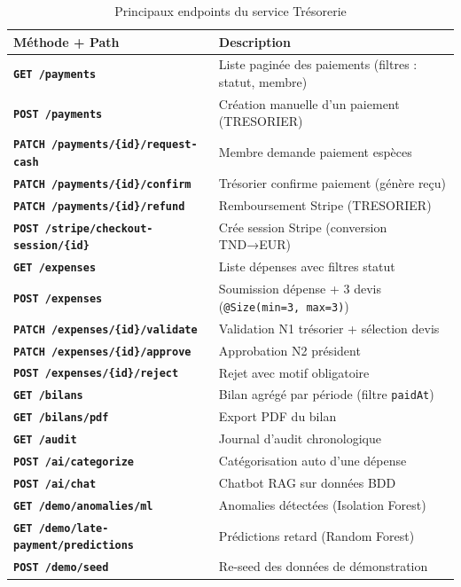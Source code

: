 \documentclass[11pt,a4paper]{article}
\begin{document}
\begin{table}[h]
  \centering
  \footnotesize
  \begin{tabularx}{\linewidth}{>{\bfseries}lX}
    \toprule
    Méthode + Path & Description \\
    \midrule
    \texttt{GET /payments}          & Liste paginée des paiements (filtres : statut, membre) \\
    \texttt{POST /payments}         & Création manuelle d'un paiement (TRESORIER) \\
    \texttt{PATCH /payments/\{id\}/request-cash}  & Membre demande paiement espèces \\
    \texttt{PATCH /payments/\{id\}/confirm}       & Trésorier confirme paiement (génère reçu) \\
    \texttt{PATCH /payments/\{id\}/refund}        & Remboursement Stripe (TRESORIER) \\
    \texttt{POST /stripe/checkout-session/\{id\}} & Crée session Stripe (conversion TND→EUR) \\
    \texttt{GET /expenses}          & Liste dépenses avec filtres statut \\
    \texttt{POST /expenses}         & Soumission dépense + 3 devis (\texttt{@Size(min=3, max=3)}) \\
    \texttt{PATCH /expenses/\{id\}/validate}      & Validation N1 trésorier + sélection devis \\
    \texttt{PATCH /expenses/\{id\}/approve}       & Approbation N2 président \\
    \texttt{POST /expenses/\{id\}/reject}         & Rejet avec motif obligatoire \\
    \texttt{GET /bilans}                          & Bilan agrégé par période (filtre \texttt{paidAt}) \\
    \texttt{GET /bilans/pdf}                      & Export PDF du bilan \\
    \texttt{GET /audit}                           & Journal d'audit chronologique \\
    \texttt{POST /ai/categorize}                  & Catégorisation auto d'une dépense \\
    \texttt{POST /ai/chat}                        & Chatbot RAG sur données BDD \\
    \texttt{GET /demo/anomalies/ml}               & Anomalies détectées (Isolation Forest) \\
    \texttt{GET /demo/late-payment/predictions}   & Prédictions retard (Random Forest) \\
    \texttt{POST /demo/seed}                      & Re-seed des données de démonstration \\
    \bottomrule
  \end{tabularx}
  \caption{Principaux endpoints du service Trésorerie}
\end{table}
\end{document}
